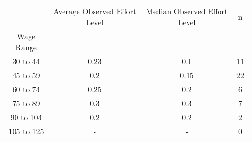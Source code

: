 \begin{tabular}{cccc}
\toprule
{} & Average Observed Effort Level & Median Observed Effort Level &   n \\
Wage Range &                               &                              &     \\
\midrule
30 to 44   &                          0.23 &                          0.1 &  11 \\
45 to 59   &                           0.2 &                         0.15 &  22 \\
60 to 74   &                          0.25 &                          0.2 &   6 \\
75 to 89   &                           0.3 &                          0.3 &   7 \\
90 to 104  &                           0.2 &                          0.2 &   2 \\
105 to 125 &                             - &                            - &   0 \\
\bottomrule
\end{tabular}
